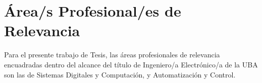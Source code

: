 \section{Área/s Profesional/es de Relevancia}

Para el presente trabajo de Tesis, las áreas profesionales de relevancia encuadradas dentro del alcance del título de Ingeniero/a Electrónico/a de la UBA son las de Sistemas Digitales y Computación, y Automatización y Control.